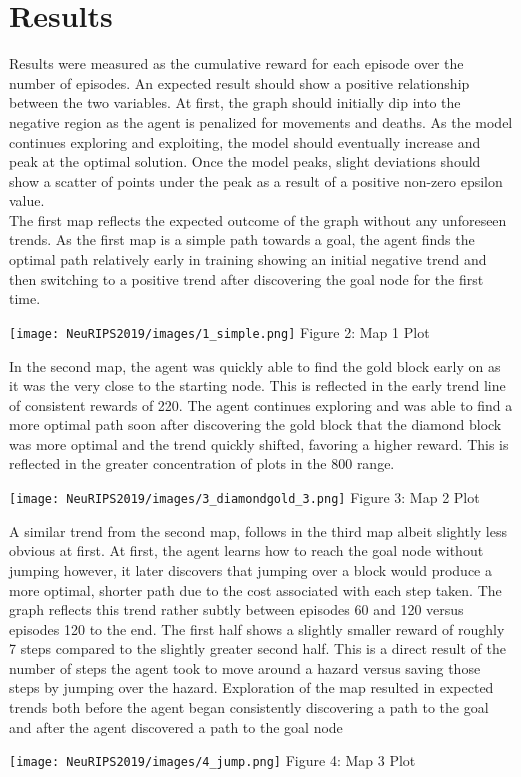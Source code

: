 \documentclass{article}
\begin{document}
\section{Results}

Results were measured as the cumulative reward for each episode over the number of episodes. An expected result should show a positive relationship between the two variables. At first, the graph should initially dip into the negative region as the agent is penalized for movements and deaths. As the model continues exploring and exploiting, the model should eventually increase and peak at the optimal solution. Once the model peaks, slight deviations should show a scatter of points under the peak as a result of a positive non-zero epsilon value. \\
The first map reflects the expected outcome of the graph without any unforeseen trends. As the first map is a simple path towards a goal, the agent finds the optimal path relatively early in training showing an initial negative trend and then switching to a positive trend after discovering the goal node for the first time. \\
\begin{center}
    \texttt{[image: NeuRIPS2019/images/1\_simple.png]}
    \center Figure 2: Map 1 Plot
\end{center}

In the second map, the agent was quickly able to find the gold block early on as it was the very close to the starting node. This is reflected in the early trend line of consistent rewards of 220. The agent continues exploring and was able to find a more optimal path soon after discovering the gold block that the diamond block was more optimal and the trend quickly shifted, favoring a higher reward. This is reflected in the greater concentration of plots in the 800 range. \\
\begin{center}
    \texttt{[image: NeuRIPS2019/images/3\_diamondgold\_3.png]}
    \center Figure 3: Map 2 Plot
\end{center}

A similar trend from the second map, follows in the third map albeit slightly less obvious at first. At first, the agent learns how to reach the goal node without jumping however, it later discovers that jumping over a block would produce a more optimal, shorter path due to the cost associated with each step taken. The graph reflects this trend rather subtly between episodes 60 and 120 versus episodes 120 to the end. The first half shows a slightly smaller reward of roughly 7 steps compared to the slightly greater second half. This is a direct result of the number of steps the agent took to move around a hazard versus saving those steps by jumping over the hazard. Exploration of the map resulted in expected trends both before the agent began consistently discovering a path to the goal and after the agent discovered a path to the goal node\\
\begin{center}
    \texttt{[image: NeuRIPS2019/images/4\_jump.png]}
    \center Figure 4: Map 3 Plot
\end{center}
\end{document}

